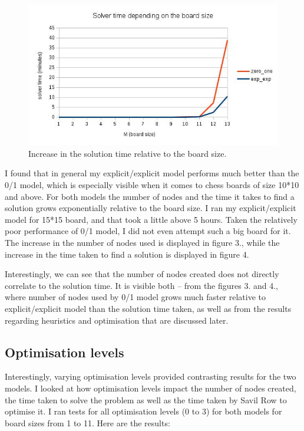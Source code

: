 \documentclass{report}
\newcommand{\tab}{\hspace*{1.5em}}
\begin{document}
\begin{figure} [\textwidth]
\includegraphics[scale=0.7]{images/solverTime.jpg}
\caption{Increase in the solution time relative to the board size.}
\end{figure}
\tab I found that in general my explicit/explicit model performs much better than the 0/1 model, which is especially visible when it comes to chess boards of size 10*10 and above. For both models the number of nodes and the time it takes to find a solution grows exponentially relative to the board size. I ran my explicit/explicit model for 15*15 board, and that took a little above 5 hours. Taken the relatively poor performance of 0/1 model, I did not even attempt such a big board for it. The increase in the number of nodes used is displayed in figure 3., while the increase in the time taken to find a solution is displayed in figure 4.

Interestingly, we can see that the number of nodes created does not directly correlate to the solution time. It is visible both -- from the figures 3. and 4., where number of nodes used by 0/1 model grows much faster relative to explicit/explicit model than the solution time taken, as well as from the results regarding heuristics and optimisation that are discussed later.

\newpage

\subsection*{Optimisation levels}
\tab Interestingly, varying optimisation levels provided contrasting results for the two models. I looked at how optimisation levels impact the number of nodes created, the time taken to solve the problem as well as the time taken by Savil Row to optimise it. I ran tests for all optimisation levels (0 to 3) for both models for board sizes from 1 to 11. Here are the results:
\end{document}
